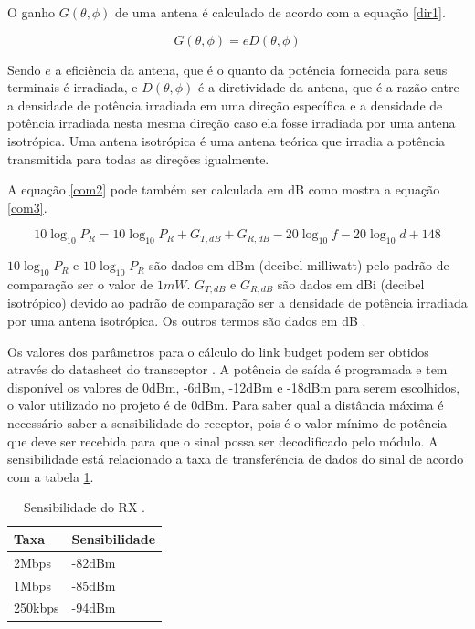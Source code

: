 O ganho $G(\theta,\phi)$ de uma antena é calculado de acordo com a equação \ref{dir1}.

\begin{equation}
\label{dir1}
    G(\theta,\phi) = eD(\theta,\phi)
\end{equation}

Sendo $e$ a eficiência da antena, que é o quanto da potência fornecida para seus terminais é irradiada, e $D(\theta,\phi)$ é a diretividade da antena, que é a razão entre a densidade de potência irradiada em uma direção específica e a densidade de potência irradiada nesta mesma direção caso ela fosse irradiada por uma antena isotrópica. Uma antena isotrópica é uma antena teórica que irradia a potência transmitida para todas as direções igualmente.

A equação \ref{com2} pode também ser calculada em dB como mostra a equação \ref{com3}.

\begin{equation}
\label{com3}
	10 \log_{10} P_{R} = 10 \log_{10} P_{R} + G_{T, dB} + G_{R, dB} - 20\log_{10}f - 20\log_{10}d+148
\end{equation}

$10 \log_{10} P_{R}$ e $10 \log_{10} P_{R}$ são dados em dBm (decibel milliwatt) pelo padrão de comparação ser o valor de $1mW$. $G_{T, dB}$ e $G_{R, dB}$ são dados em dBi (decibel isotrópico) devido ao padrão de comparação ser a densidade de potência irradiada por uma antena isotrópica. Os outros termos são dados em dB \cite{pauleletromagnetismo}.

Os valores dos parâmetros para o cálculo do link budget podem ser obtidos através do datasheet do transceptor \cite{ns:nrfl01}. A potência de saída é programada e tem disponível os valores de 0dBm, -6dBm, -12dBm e -18dBm para serem escolhidos, o valor utilizado no projeto é de 0dBm. Para saber qual a distância máxima é necessário saber a sensibilidade do receptor, pois é o valor mínimo de potência que deve ser recebida para que o sinal possa ser decodificado pelo módulo. A sensibilidade está relacionado a taxa de transferência de dados do sinal de acordo com a tabela  \ref{sensibilidade}.

\begin{table}[h]
\centering
\caption{Sensibilidade do RX \cite{ns:nrfl01}.}
\label{sensibilidade}
\begin{tabular}{|l|l|}
\hline
Taxa    & Sensibilidade \\ \hline
2Mbps   & -82dBm        \\ \hline
1Mbps   & -85dBm        \\ \hline
250kbps & -94dBm        \\ \hline
\end{tabular}
\end{table}

